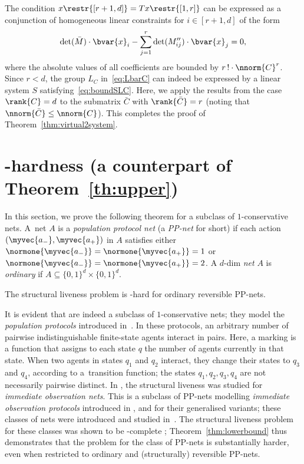 The condition $x\restr{[r+1,d]}=T x\restr{[1,r]}$ can be expressed
as a conjunction of homogeneous linear constraints for $i\in[r{+}1,d]$ of the form 
\[
	\det(\bar{M}) \cdot \bvar{x}_i - \sum_{j=1}^r \det(M''_{ij}) \cdot
    \bvar{x}_j = 0,
\]
where the absolute values of all coefficients are bounded by
$r\,! \cdot \nnorm{C}^r$. 
Since $r < d$, the group $L_{C}$ in~\eqref{eq:LbarC} can indeed
be expressed by a linear system $S$ satisfying~\eqref{eq:boundSLC}.
Here, we apply the results from the case $\rank{C} = d$ to the
submatrix $\bar{C}$ with $\rank{\bar{C}} = r$ (noting that
$\nnorm{\bar{C}} \leq \nnorm{C}$). This completes the proof of Theorem~\ref{thm:virtual2system}.
\section{\EXPSPACE-hardness 
(a counterpart of Theorem~\ref{th:upper})}\label{sec:hardness}
In this section, we prove the following theorem for a subclass
of $1$-conservative nets.
A~net $A$ is a
\emph{population protocol net} (a \emph{PP-net} for short) if each action
$(\myvec{a_-},\myvec{a_+})$ in $A$ satisfies either
$\normone{\myvec{a_-}} = \normone{\myvec{a_+}} = 1$ or
$\normone{\myvec{a_-}} = \normone{\myvec{a_+}} = 2$.
A $d$-dim \emph{net} $A$ is \emph{ordinary} if $A\subseteq \{0,1\}^d\times\{0,1\}^d$. 

\begin{thm}\label{thm:lowerbound}
	The structural liveness problem is
    \EXPSPACE-hard for ordinary reversible PP-nets.
\end{thm}

\begin{rem}
It is evident that \ppnets are indeed a subclass of
$1$-conservative nets; they model the \emph{population
protocols} introduced
in~\cite{DBLP:journals/dc/AngluinADFP06}. In these protocols,
an arbitrary number of pairwise indistinguishable
finite-state agents interact in pairs. 
Here, a marking is a function that assigns to each state $q$ the
number of agents currently in that state.
When two
agents in states $q_1$ and $q_2$ interact, they
change their states to $q_3$ and $q_4$, 
according to a~transition function; the states $q_1,q_2,q_3,q_4$ are
not necessarily pairwise distinct. In \cite{DBLP:journals/fuin/JancarV22},
 the structural liveness was studied  for \emph{immediate observation
nets}. This is a subclass of
PP-nets modelling \emph{immediate observation protocols} introduced in
\cite{DBLP:journals/dc/AngluinAER07}, 
and for their generalised variants; these classes of nets
were introduced and studied
in~\cite{DBLP:conf/apn/EsparzaRW19,DBLP:conf/rp/RaskinW20,DBLP:conf/concur/RaskinWE20,DBLP:phd/dnb/Weil-Kennedy23}.
The structural liveness problem for these classes was shown to be 
\PSPACE-complete \cite{DBLP:journals/fuin/JancarV22};
Theorem~\ref{thm:lowerbound} thus demonstrates that the problem for the class
of PP-nets is substantially harder, even when restricted to ordinary
and (structurally) reversible PP-nets.
\end{rem}

